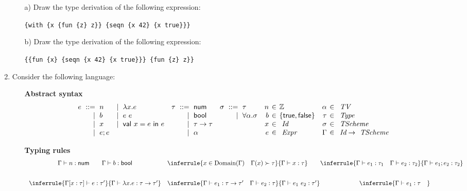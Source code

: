 \begin{enumerate}
\begin{itemize}
  \item[a)] Draw the type derivation of the following expression:

\verb!{with {x {fun {z} z}} {seqn {x 42} {x true}}}!

  \item[b)] Draw the type derivation of the following expression:

\verb!{{fun {x} {seqn {x 42} {x true}}} {fun {z} z}}!
\end{itemize}

\item Consider the following language:
\begin{itemize}
  \item[]\textbf{ Abstract syntax}
\[
\begin{array}{r@{\hskip6pt}r@{\hskip6pt}l
  r@{\hskip6pt}l@{\hskip10pt}
  r@{\hskip6pt}r@{\hskip6pt}l@{\hskip10pt}
  r@{\hskip6pt}r@{\hskip6pt}l@{\hskip10pt}
  r@{\hskip4pt}c@{\hskip4pt}l@{\hskip10pt}
  r@{\hskip4pt}c@{\hskip4pt}l}
  e &::= & n &|& \lambda x.e & \tau &::= & \textsf{num} & \sigma &::=& \tau &
  n &\in& \mathbb{Z} & \alpha &\in& \textit{ TV} \\
  &|& b &|& e\ e &&|& \textsf{bool} &&|& \forall\alpha.\sigma &
  b &\in &\{\textsf{true},\textsf{false}\} & \tau &\in& \textit{ Type} \\
  &|& x &|& \textsf{val}\ x=e\ \textsf{in}\ e &&|& \tau\rightarrow\tau &&&&
  x &\in & \textit{ Id} & \sigma &\in& \textit{ TScheme} \\
  &|& e;e &&&&|& \alpha &&&& e &\in& \textit{ Expr} & \Gamma &\in& \textit{ Id}\rightarrow\textit{ TScheme} \\
\end{array}
\]
  \item[]\textbf{ Typing rules}
\[
\begin{array}{ccc}
  \Gamma\vdash n:\textsf{num}
  \qquad
  \Gamma\vdash b:\textsf{bool}
  &
  \multicolumn{2}{c}{
  \inferrule
  {
    x\in\Dom{\Gamma} \rulesep
    \Gamma(x) \succ \tau
  }
  { \Gamma\vdash x:\tau}
  \qquad
  \inferrule
  {
    \Gamma\vdash e_1:\tau_1 \rulesep
    \Gamma\vdash e_2:\tau_2
  }
  { \Gamma\vdash e_1;e_2:\tau_2 }
  }
  \\[20pt]
  \inferrule
  { \Gamma[x : \tau]\vdash e : \tau' }
  {\Gamma\vdash \lambda x.e : \tau\rightarrow\tau'}
  &
  \inferrule
  {
    \Gamma\vdash e_1 : \tau\rightarrow\tau' \rulesep
    \Gamma\vdash e_2 : \tau
  }
  { \Gamma\vdash e_1\ e_2 : \tau' }
  &
  \inferrule
  {
    \Gamma\vdash e_1 : \tau \rulesep
}
\end{array}\]
\end{itemize}
\end{enumerate}
